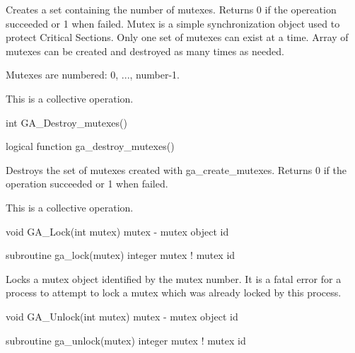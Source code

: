 \documentclass[12pt]{article}
\begin{document}
\begin{desc}

Creates a set containing the number of mutexes. Returns 0 if the opereation succeeded or 1 when failed. Mutex is a simple synchronization object used to protect Critical Sections. Only one set of mutexes can exist at a time. Array of mutexes can be created and destroyed as many times as needed.

Mutexes are numbered: 0, ..., number-1.

This is a collective operation.
\end{desc}


\begin{capi}
int GA_Destroy_mutexes()
\end{capi}
\begin{fapi}
logical function ga_destroy_mutexes()
\end{fapi}

\begin{desc}

Destroys the set of mutexes created with ga_create_mutexes. Returns 0 if the operation succeeded or 1 when failed.

This is a collective operation.
\end{desc}


\begin{capi}
void GA_Lock(int mutex)
   mutex - mutex object id   \access{[input]} 
\end{capi}
\begin{fapi}
subroutine ga_lock(mutex)
   integer mutex      \access{[input]}   ! mutex id
\end{fapi}

\begin{desc}

Locks a mutex object identified by the mutex number. It is a fatal error for a process to attempt to lock a mutex which was already locked by this process.
\end{desc}


\begin{capi}
void GA_Unlock(int mutex)
   mutex  - mutex object id  \access{[input]} 
\end{capi}
\begin{fapi}
subroutine ga_unlock(mutex)
   integer mutex  \access{[input]}  ! mutex id
\end{fapi}
\end{document}
